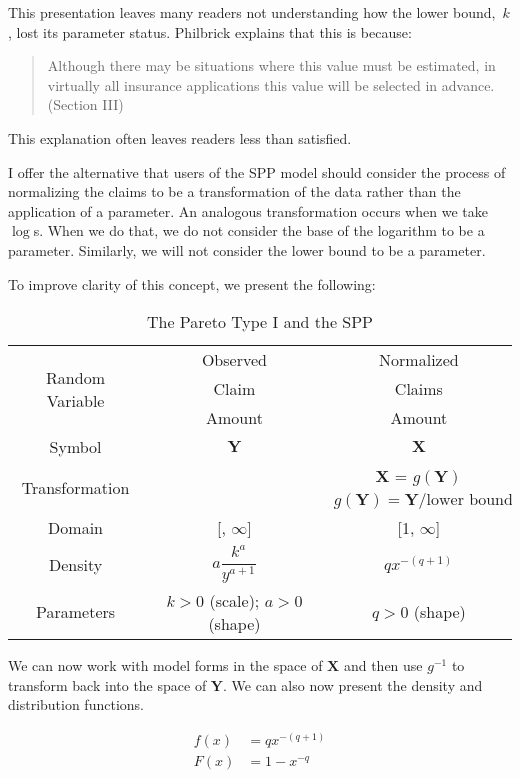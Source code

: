 \documentclass[]{article} %
\begin{document}
This presentation leaves many readers not understanding how the lower bound,~$k$,  lost its parameter status. Philbrick explains that this is because:
\begin{quote}
	Although there may be situations where this value must	be estimated, in virtually all insurance applications this value will be selected in advance. (Section III)
\end{quote}
This explanation often leaves readers less than satisfied.

I offer the alternative that users of the SPP model should consider the process of normalizing the claims to be a transformation of the data rather than the application of a parameter. An analogous transformation occurs when we take $\log$s. When we do that, we do not consider the base of the logarithm to be a parameter. Similarly, we will not consider the lower bound to be a parameter.

To improve clarity of this concept, we present the following:

\begin{table}[h!]
	\centering
	\begin{tabular}[h]{ccc}
		\toprule
		\multirow{3}{*}{Random Variable}& Observed & Normalized\\
		& Claim & Claims\\
		& Amount & Amount \\ \midrule
		Symbol & $\mathbf{Y}$ & $\mathbf{X}$\\ \midrule
		\multirow{2}{*}{Transformation} & & $\mathbf{X}$  =  $g(\mathbf{Y})$\\
		& & $g(\mathbf{Y}) =   \mathbf{Y}/\text{lower bound}$  \\ \midrule
		Domain & [\text{lower bound}, $\infty$] & [1, $\infty$]\\ \midrule
		Density & $a \dfrac{k^a}{y^{a+1}}$ & $qx^{-(q+1)}$\\ \midrule
		Parameters & $k>0$ (scale); $a>0$ (shape)& $q>0$ (shape)\\ 
	\bottomrule
	\end{tabular}
	\caption{The Pareto Type I and the SPP}\label{tbl:PIvSpp}			
\end{table}
We can now work with model forms in the space of $\mathbf{X}$ and then use $g^{-1}$ to transform back into the space of $\mathbf{Y}$. We can also now present the density and distribution functions.

\begin{align}
		f(x) & =  qx^{-(q+1)}\label{SPPf}\\
		F(x) & =  1 - x^{-q}\label{SPPF}
\end{align}
\end{document}
